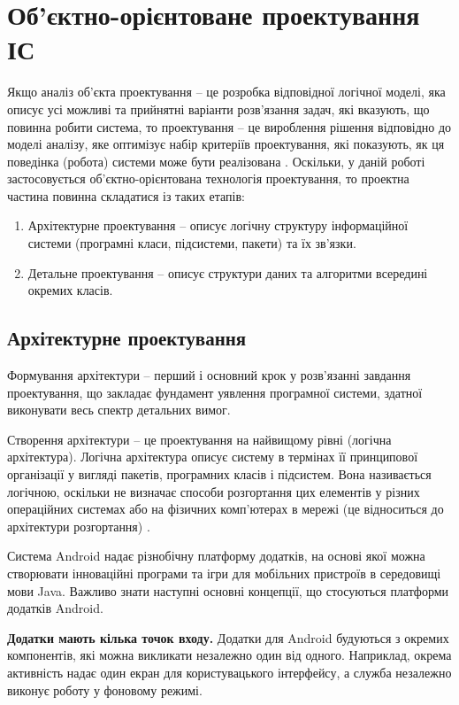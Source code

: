 \documentclass[../main.tex]{subfiles}
\begin{document}
\chapter{Об’єктно-орієнтоване проектування ІС}

Якщо аналіз об’єкта проектування – це розробка відповідної логічної моделі, яка описує усі можливі та прийнятні варіанти розв’язання задач, які вказують, що повинна робити система, то проектування – це вироблення рішення відповідно до моделі аналізу, яке оптимізує набір критеріїв проектування, які  показують, як ця поведінка (робота) системи може бути реалізована \cite{diploma_guidelines}.
Оскільки, у даній роботі застосовується об’єктно-орієнтована технологія проектування, то проектна частина повинна складатися із таких етапів:

\begin{enumerate}
	\item Архітектурне проектування – описує логічну структуру інформаційної системи (програмні класи, підсистеми,  пакети) та їх зв’язки.
	\item Детальне проектування – описує структури даних та алгоритми всередині окремих класів. 
\end{enumerate}

\section{Архітектурне проектування}
Формування архітектури – перший і основний крок у розв’язанні завдання проектування, що закладає фундамент уявлення програмної системи, здатної виконувати весь спектр детальних вимог. \cite{diploma_guidelines2}

Створення архітектури – це проектування на найвищому рівні (логічна архітектура). Логічна архітектура описує систему в термінах її принципової організації у вигляді пакетів, програмних класів і підсистем. Вона називається логічною, оскільки не визначає способи розгортання цих елементів у різних операційних системах або на фізичних комп’ютерах в мережі (це відноситься до архітектури розгортання) \cite{diploma_guidelines}.

Система Android надає різнобічну платформу додатків, на основі якої можна створювати інноваційні програми та ігри для мобільних пристроїв в середовищі мови Java. Важливо знати наступні основні концепції, що стосуються платформи додатків Android.

\textbf{Додатки мають кілька точок входу.} 
Додатки для Android будуються з окремих компонентів, які можна викликати незалежно один від одного. Наприклад, окрема активність надає один екран для користувацького інтерфейсу, а служба незалежно виконує роботу у фоновому режимі.
	
\end{document}
